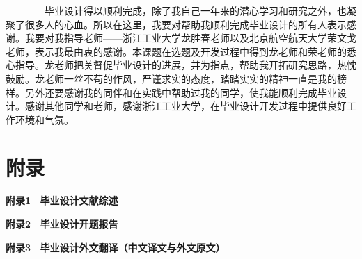 \documentclass[oneside]{ZJUthesis}
\begin{document}
\backmatter

\begin{thanks}
~~~~~~~~毕业设计得以顺利完成，除了我自己一年来的潜心学习和研究之外，也凝聚了很多人的心血。所以在这里，我要对帮助我顺利完成毕业设计的所有人表示感谢。我要对我指导老师——浙江工业大学龙胜春老师以及北京航空航天大学荣文戈老师，表示我最由衷的感谢。本课题在选题及开发过程中得到龙老师和荣老师的悉心指导。龙老师把关督促毕业设计的进展，并为指点，帮助我开拓研究思路，热忱鼓励。龙老师一丝不苟的作风，严谨求实的态度，踏踏实实的精神一直是我的榜样。另外还要感谢我的同伴和在实践中帮助过我的同学，使我能顺利完成毕业设计。感谢其他同学和老师，感谢浙江工业大学，在毕业设计开发过程中提供良好工作环境和气氛。
\end{thanks}


\appendix
\chapter{附录}
\textbf{附录1~ 毕业设计文献综述}

\textbf{附录2~ 毕业设计开题报告}

\textbf{附录3~ 毕业设计外文翻译（中文译文与外文原文）}


\ZJUindex
\end{document}
